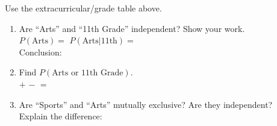 \documentclass[10pt]{article}
\begin{document}
\begin{practicebox}
\small Use the extracurricular/grade table above.

\vspace{6pt}
\begin{enumerate}[leftmargin=1.5em, itemsep=10pt]
  \item Are ``Arts'' and ``11th Grade'' independent? Show your work.\\
        $P(\text{Arts}) = $ \blank{3cm} \quad $P(\text{Arts}|\text{11th}) = $ \blank{3cm}\\
        Conclusion: \writeline

  \item Find $P(\text{Arts or 11th Grade})$.\\
        \blank{3cm} $+$ \blank{3cm} $-$ \blank{3cm} $=$ \blank{3cm}

  \item Are ``Sports'' and ``Arts'' mutually exclusive? \blank{2cm} Are they independent?
        \blank{2cm}\\
        Explain the difference: \writeline\writeline
\end{enumerate}
\end{practicebox}
\end{document}
